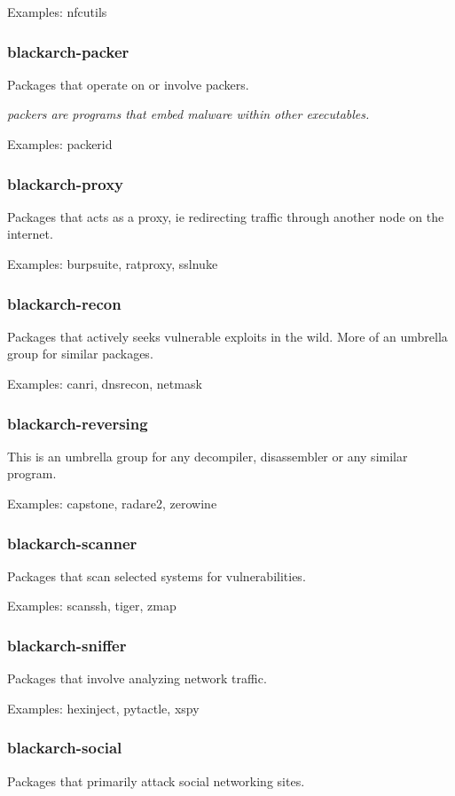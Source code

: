 \documentclass[a4paper, oneside, 11pt]{book}
\begin{document}
Examples: nfcutils

\subsubsection{blackarch-packer}
Packages that operate on or involve packers.

\textit{packers are programs that embed malware within other executables.}

Examples: packerid

\subsubsection{blackarch-proxy}
Packages that acts as a proxy, ie redirecting traffic
through another node on the internet.

Examples: burpsuite, ratproxy, sslnuke

\subsubsection{blackarch-recon}
Packages that actively seeks vulnerable exploits in the
wild. More of an umbrella group for similar packages.

Examples: canri, dnsrecon, netmask

\subsubsection{blackarch-reversing}
This is an umbrella group for any decompiler,
disassembler or any similar program.

Examples: capstone, radare2, zerowine

\subsubsection{blackarch-scanner}
Packages that scan selected systems for vulnerabilities.

Examples: scanssh, tiger, zmap

\subsubsection{blackarch-sniffer}
Packages that involve analyzing network traffic.

Examples: hexinject, pytactle, xspy

\subsubsection{blackarch-social}
Packages that primarily attack social networking sites.
\end{document}
